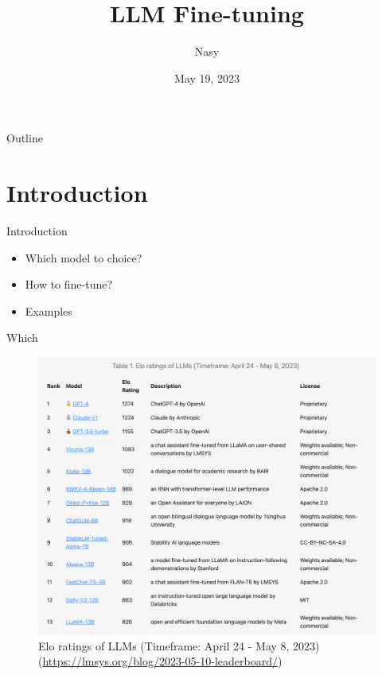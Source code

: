 \documentclass[aspectratio=1610,xcolor={dvipsnames},hyperref={colorlinks,unicode,linkcolor=violet,anchorcolor=BlueViolet,citecolor=YellowOrange,filecolor=black,urlcolor=Aquamarine}]{beamer}
\author{Nasy}
\date{May 19, 2023}
\title{LLM Fine-tuning}
\begin{document}
\maketitle
\begin{frame}{Outline}
\setcounter{tocdepth}{1}
\tableofcontents
\end{frame}

\setcounter{tocdepth}{2}

\section{Introduction}
\label{sec:org6d902f1}

\begin{frame}[label={sec:orgdce5aba}]{Introduction}
\begin{itemize}
\item Which model to choice?
\item How to fine-tune?
\item Examples
\end{itemize}
\end{frame}

\begin{frame}[label={sec:org38d3980}]{Which}
\begin{figure}[htbp]
\centering
\includegraphics[width=.9\linewidth]{./p1.png}
\caption{\label{fig:org64412fd}Elo ratings of LLMs (Timeframe: April 24 - May 8, 2023) (\url{https://lmsys.org/blog/2023-05-10-leaderboard/})}
\end{figure}
\end{frame}
\end{document}
